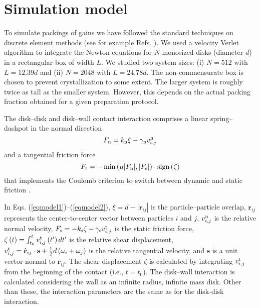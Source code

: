 \section{Simulation model}        

To simulate packings of gains we have followed the standard techniques on discrete element methods (see for example Refs. \cite{cundall,poschel,schafer}). We used a velocity Verlet algorithm to integrate the Newton equations for $N$ monosized disks (diameter $d$) in a rectangular box of width $L$. We studied two system sizes: (i) $N=512$ with $L=12.39 d$ and (ii) $N=2048$ with $L=24.78 d$. The non-commensurate box is chosen to prevent crystallization to some extent. The larger system is roughly twice as tall as the smaller system. However, this depends on the actual packing fraction obtained for a given preparation protocol. 

The disk--disk and disk--wall contact interaction comprises a linear spring--dashpot in the normal direction 
\begin{equation}
F_{\rm{n}}=k_{\rm{n}}\xi -\gamma _{\rm{n}}v_{i,j}^{\rm{n}} \label{eqmodel1}
\end{equation} 
and a tangential friction force 
\begin{equation}
F_{\rm{t}}=-\min \left( \mu |F_{\rm{n}}|,|F_{\rm{s}}|\right) \cdot \rm{sign}\left( \zeta \right) \label{eqmodel2}
\end{equation} 
that implements the Coulomb criterion to switch between dynamic and static friction \cite{arevalo,pugnaloni4}. 

In Eqs. (\ref{eqmodel1})--(\ref{eqmodel2}), $\xi =d-\left\vert \mathbf{r}_{ij}\right\vert $ is the particle--particle overlap, $\mathbf{r}_{ij}$ represents the center-to-center vector between particles $i$ and $j$, $v_{i,j}^{\rm{n}}$ is the relative normal velocity, $F_{\rm{s}}=-k_{\rm{s}}\zeta -\gamma _{\rm{s}}v_{i,j}^{\rm{t}}$ is the static friction force, $\zeta \left( t\right) =\int_{t_{0}}^{t}v_{i,j}^{\rm{t}}\left( t^{\prime}\right) dt^{\prime }$ is the relative shear displacement, $v_{i,j}^{\rm{t}}=\dot{\mathbf{r}}_{ij}\cdot \mathbf{s}+\frac{1}{2}d\left(\omega _{i}+\omega _{j}\right)$ is the relative tangential velocity, and $\mathbf{s}$ is a unit vector normal to $\mathbf{r}_{ij}$. The shear displacement $\zeta $ is calculated by integrating $v_{i,j}^{\rm{t}}$ from the beginning of the contact (i.e., $t=t_{0}$). The disk--wall interaction is calculated considering the wall as an infinite radius, infinite mass disk. Other than these, the interaction parameters are the same as for the disk-disk interaction.

